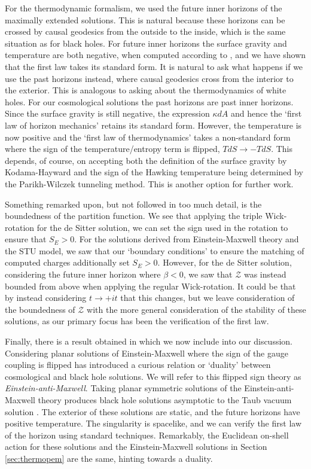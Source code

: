 For the thermodynamic formalism, we used the future inner horizons of the maximally extended solutions. This is natural because these horizons can be crossed by causal geodesics from the outside to the inside, which is the same situation as for black holes. For future inner horizons the surface gravity and temperature are both negative, when computed according to \cite{Hayward:1997jp, Binetruy:2014ela, Helou:2015zma}, and we have shown that the first law takes its standard form. It is natural to ask what happens if we use the past horizons instead, where causal geodesics cross from the interior to the exterior. This is analogous to asking about the thermodynamics of white holes. For our cosmological solutions the past horizons are past inner horizons. Since the surface gravity is still negative, the expression $\kappa dA$ and hence the `first law of horizon mechanics' retains its standard form. However, the temperature is now positive and the `first law of thermodynamics' takes a non-standard form where the sign of the temperature/entropy term is flipped,  $TdS \rightarrow -T dS$. This depends, of course, on accepting both  the definition of the surface gravity by Kodama-Hayward and the sign of the Hawking temperature being determined by the Parikh-Wilczek tunneling method. This is another option for further work.

Something remarked upon, but not followed in too much detail, is the boundedness of the partition function. We see that applying the triple Wick-rotation for the de Sitter solution, we can set the sign used in the rotation to ensure that $S_E > 0$. For the solutions derived from Einstein-Maxwell theory and the STU model, we saw that our `boundary conditions' to ensure the matching of computed charges additionally set $S_E > 0$. However, for the de Sitter solution, considering the future inner horizon where $\beta < 0$, we saw that $\mathcal{Z}$ was instead bounded from above when applying the regular Wick-rotation. It could be that by instead considering $t \to + i t$ that this changes, but we leave consideration of the boundedness of  $\mathcal{Z}$ with the more general consideration of the stability of these solutions, as our primary focus has been the verification of the first law.

Finally, there is a result obtained in \cite{Gutowski:2020fzb} which we now include into our discussion. Considering planar solutions of Einstein-Maxwell where the sign of the gauge coupling is flipped has introduced a curious relation or `duality' between cosmological and black hole solutions. We will refer to this flipped sign theory as \emph{Einstein-anti-Maxwell}. Taking planar symmetric solutions of the Einstein-anti-Maxwell theory produces black hole solutions asymptotic to the Taub vacuum solution \cite{Taub:1951}. The exterior of these solutions are static, and the future horizons have positive temperature. The singularity is spacelike, and we can verify the first law of the horizon using standard techniques. Remarkably, the Euclidean on-shell action for these solutions and the Einstein-Maxwell solutions in Section \ref{sec:thermopem} are the same, hinting towards a duality.


